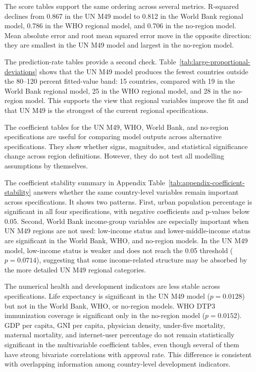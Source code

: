 \documentclass[runningheads]{llncs}
\begin{document}
The score tables support the same ordering across several metrics. R-squared declines from 0.867 in the UN M49 model to 0.812 in the World Bank regional model, 0.786 in the WHO regional model, and 0.706 in the no-region model. Mean absolute error and root mean squared error move in the opposite direction: they are smallest in the UN M49 model and largest in the no-region model.

The prediction-rate tables provide a second check. Table~\ref{tab:large-proportional-deviations} shows that the UN M49 model produces the fewest countries outside the 80--120 percent fitted-value band: 15 countries, compared with 19 in the World Bank regional model, 25 in the WHO regional model, and 28 in the no-region model. This supports the view that regional variables improve the fit and that UN M49 is the strongest of the current regional specifications.

The coefficient tables for the UN M49, WHO, World Bank, and no-region specifications are useful for comparing model outputs across alternative specifications. They show whether signs, magnitudes, and statistical significance change across region definitions. However, they do not test all modelling assumptions by themselves.

The coefficient stability summary in Appendix Table~\ref{tab:appendix-coefficient-stability} answers whether the same country-level variables remain important across specifications. It shows two patterns. First, urban population percentage is significant in all four specifications, with negative coefficients and p-values below 0.05. Second, World Bank income-group variables are especially important when UN M49 regions are not used: low-income status and lower-middle-income status are significant in the World Bank, WHO, and no-region models. In the UN M49 model, low-income status is weaker and does not reach the 0.05 threshold ($p = 0.0714$), suggesting that some income-related structure may be absorbed by the more detailed UN M49 regional categories.

The numerical health and development indicators are less stable across specifications. Life expectancy is significant in the UN M49 model ($p = 0.0128$) but not in the World Bank, WHO, or no-region models. WHO DTP3 immunization coverage is significant only in the no-region model ($p = 0.0152$). GDP per capita, GNI per capita, physician density, under-five mortality, maternal mortality, and internet-user percentage do not remain statistically significant in the multivariable coefficient tables, even though several of them have strong bivariate correlations with approval rate. This difference is consistent with overlapping information among country-level development indicators.
\end{document}
